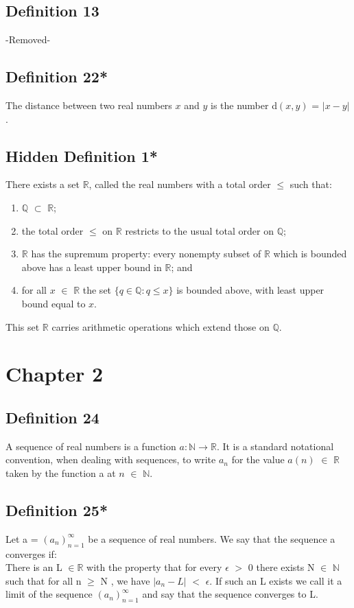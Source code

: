 \documentclass{article}
\begin{document}
\subsection{Definition 13}
-Removed-

\subsection{Definition 22*}
The distance between two real numbers $x$ and $y$ is the number
d$(x, y)$ = $|x - y|$.

\subsection{Hidden Definition 1*}
There exists a set $\mathbb{R}$, called the real numbers with a total
order $\leq$ such that:
\begin{enumerate}
\item $\mathbb{Q}$ $\subset$ $\mathbb{R}$;
\item the total order $\leq$ on $\mathbb{R}$
restricts to the usual total order on $\mathbb{Q}$;
\item $\mathbb{R}$ has the supremum property:
every nonempty subset of $\mathbb{R}$ which is bounded
above has a least upper bound in $\mathbb{R}$; and
\item for all $x$ $\in$ $\mathbb{R}$ the set $\{ q \in \mathbb{Q} : q \leq x \}$ is bounded above, with least upper bound
equal to $x$.
\end{enumerate}
This set $\mathbb{R}$ carries arithmetic operations which extend those on $\mathbb{Q}$.
\newpage{}
\section*{Chapter 2}
\subsection{Definition 24}
A sequence of real numbers is a function $a : \mathbb{N} \rightarrow \mathbb{R}$. It is a standard
notational convention, when dealing with sequences, to write $a_n$ for the value $a(n)$ $\in$ $\mathbb{R}$
taken by the function a at $n$ $\in$ $\mathbb{N}$.


\subsection{Definition 25*}
Let a = $(a_n)^{\infty}_{n=1}$ be a sequence of real numbers. We say that the sequence
a converges if: \\
\newline
There is an L $\in \mathbb{R}$ with the property that for every $\epsilon$ $>$ 0 there exists
N $\in$ $\mathbb{N}$ such that for all n $\geq$ N , we have $|a_n - L|$ $<$ $\epsilon$.
If such an L exists we call it a limit of the sequence $(a_n)^{\infty}_{n=1}$ and say that the sequence
converges to L.
\end{document}
